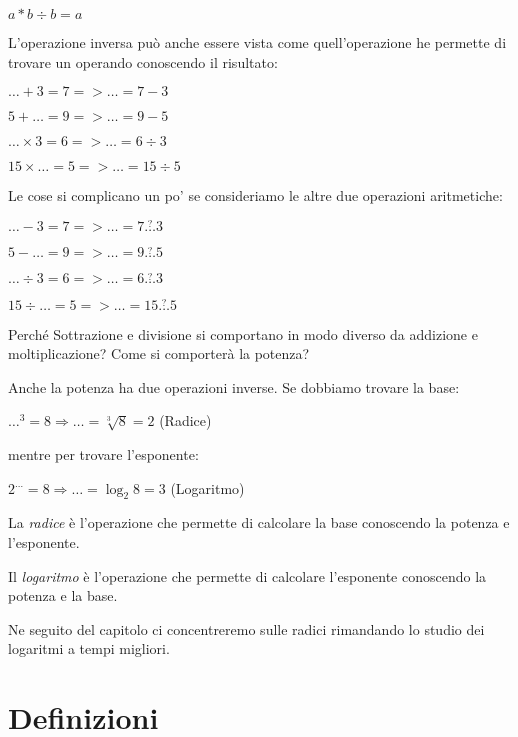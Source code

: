\(a * b \div b= a\)

L'operazione inversa può anche essere vista come quell'operazione he permette 
di trovare un operando conoscendo il risultato:

\(\dots + 3 = 7 => \dots = 7 - 3\)

\(5 + \dots = 9 => \dots = 9 - 5\)

\(\dots \times 3 = 6 => \dots = 6 \div 3\)

\(15 \times \dots = 5 => \dots = 15 \div 5\)

Le cose si complicano un po' se consideriamo le altre due operazioni 
aritmetiche:

\(\dots - 3 = 7 => \dots = 7 \overset{?}{\dots} 3\)

\(5 - \dots = 9 => \dots = 9 \overset{?}{\dots} 5\)

\(\dots \div 3 = 6 => \dots = 6 \overset{?}{\dots} 3\)

\(15 \div \dots = 5 => \dots = 15 \overset{?}{\dots} 5\)

Perché Sottrazione e divisione si comportano in modo diverso da addizione e 
moltiplicazione? Come si comporterà la potenza?

Anche la potenza ha due operazioni inverse. Se dobbiamo trovare la base:

\(\dots ^3 = 8 \Rightarrow \dots = \sqrt[3]{8} = 2\) (Radice)

mentre per trovare l'esponente:

\(2 ^{\dots} = 8 \Rightarrow \dots = \log_{2}{8} = 3\) (Logaritmo)

\begin{definizione}
La \emph{radice} è l'operazione che permette di calcolare la base conoscendo
la potenza e l'esponente.
\end{definizione}

\begin{definizione}
Il \emph{logaritmo} è l'operazione che permette di calcolare l'esponente
conoscendo la potenza e la base.
\end{definizione}

Ne seguito del capitolo ci concentreremo sulle radici rimandando lo studio
dei logaritmi a tempi migliori. 

\section{Definizioni}
\label{sec:radicali_definizioni}

